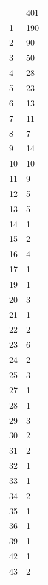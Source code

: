 \documentclass[12pt]{article}
\begin{document}
\begin{itemize}
\begin{center}
\begin{longtable}{|l|l|}
        \hline \hline
        \endlastfoot
        0        & 401    \\
        1        & 190    \\
        2        & 90     \\
        3        & 50     \\
        4        & 28     \\
        5        & 23     \\
        6        & 13     \\
        7        & 11     \\
        8        & 7      \\
        9        & 14     \\
        10       & 10     \\
        11       & 9      \\
        12       & 5      \\
        13       & 5      \\
        14       & 1      \\
        15       & 2      \\
        16       & 4      \\
        17       & 1      \\
        19       & 1      \\
        20       & 3      \\
        21       & 1      \\
        22       & 2      \\
        23       & 6      \\
        24       & 2      \\
        25       & 3      \\
        27       & 1      \\
        28       & 1      \\
        29       & 3      \\
        30       & 2      \\
        31       & 2      \\
        32       & 1      \\
        33       & 1      \\
        34       & 2      \\
        35       & 1      \\
        36       & 1      \\
        39       & 1      \\
        42       & 1      \\
        43       & 2      \\

\end{longtable}
\end{center}
\end{itemize}
\end{document}
